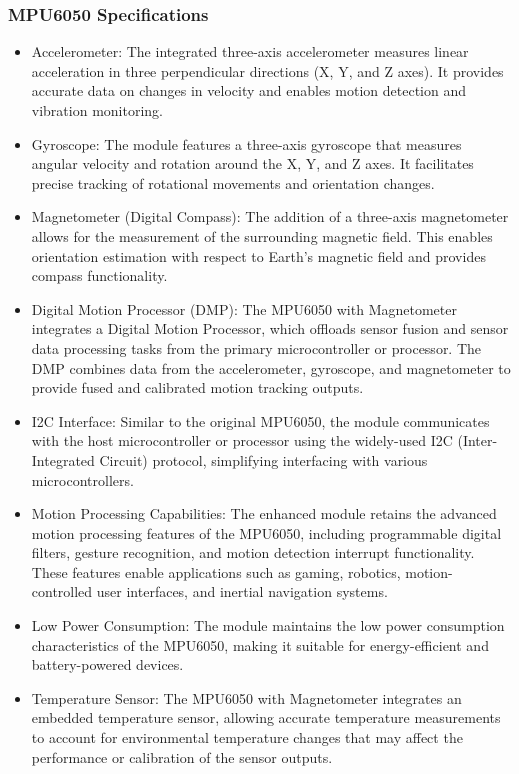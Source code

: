 \documentclass[
12pt,
oneside, 
onehalfspacing, 
nolistspacing, 
parskip, 
chapterinoneline, 
]{AASTCOMPUTER}
\begin{document}
\subsubsection{MPU6050 Specifications}
\begin{itemize}
\item Accelerometer: The integrated three-axis accelerometer measures linear acceleration in three perpendicular directions (X, Y, and Z axes). It provides accurate data on changes in velocity and enables motion detection and vibration monitoring.
\item Gyroscope: The module features a three-axis gyroscope that measures angular velocity and rotation around the X, Y, and Z axes. It facilitates precise tracking of rotational movements and orientation changes.
\item Magnetometer (Digital Compass): The addition of a three-axis magnetometer allows for the measurement of the surrounding magnetic field. This enables orientation estimation with respect to Earth's magnetic field and provides compass functionality.
\item Digital Motion Processor (DMP): The MPU6050 with Magnetometer integrates a Digital Motion Processor, which offloads sensor fusion and sensor data processing tasks from the primary microcontroller or processor. The DMP combines data from the accelerometer, gyroscope, and magnetometer to provide fused and calibrated motion tracking outputs.
\item I2C Interface: Similar to the original MPU6050, the module communicates with the host microcontroller or processor using the widely-used I2C (Inter-Integrated Circuit) protocol, simplifying interfacing with various microcontrollers.
\item Motion Processing Capabilities: The enhanced module retains the advanced motion processing features of the MPU6050, including programmable digital filters, gesture recognition, and motion detection interrupt functionality. These features enable applications such as gaming, robotics, motion-controlled user interfaces, and inertial navigation systems.
\item Low Power Consumption: The module maintains the low power consumption characteristics of the MPU6050, making it suitable for energy-efficient and battery-powered devices.
\item Temperature Sensor: The MPU6050 with Magnetometer integrates an embedded temperature sensor, allowing accurate temperature measurements to account for environmental temperature changes that may affect the performance or calibration of the sensor outputs.
\end{itemize}
\end{document}
